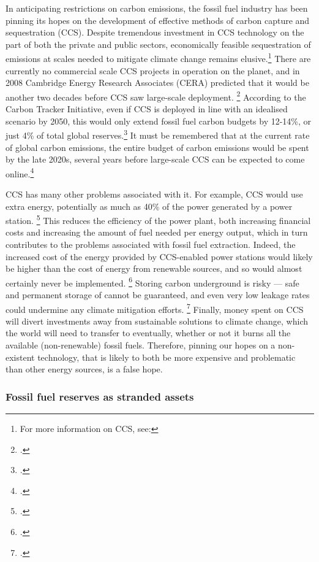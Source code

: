 In anticipating restrictions on carbon emissions, the fossil fuel industry has been pinning its hopes on the development of effective methods of carbon capture and sequestration (CCS). 
Despite tremendous investment in CCS technology on the part of both the private and public sectors, economically feasible sequestration of emissions at scales needed to mitigate climate change remains elusive.\footnote{For more information on CCS, see: }
There are currently no commercial scale CCS projects in operation on the planet, and in 2008 Cambridge Energy Research Associates (CERA) predicted that it would be another two decades before CCS saw large-scale deployment. \footcite{CERACrossing}
According to the Carbon Tracker Initiative, even if CCS is deployed in line with an idealised scenario by 2050, this would only extend fossil fuel carbon budgets by 12-14\%, or just 4\% of total global reserves.\footcite{CTI2013}
It must be remembered that at the current rate of global carbon emissions, the entire budget of carbon emissions would be spent by the late 2020s, several years before large-scale CCS can be expected to come online.\footcite{CTI2012}



CCS has many other problems associated with it. For example, CCS would use extra energy, potentially as much as 40\% of the power generated by a power station. \footcite{GPCCS}
This reduces the efficiency of the power plant, both increasing financial costs and increasing the amount of fuel needed per energy output, which in turn contributes to the problems associated with fossil fuel extraction.
Indeed, the increased cost of the energy provided by CCS-enabled power stations would likely be higher than the cost of energy from renewable sources, and so would almost certainly never be implemented. \footcite{SmartPlanetCCS}
Storing carbon underground is risky --- safe and permanent storage of  cannot be guaranteed, and even very low leakage rates could undermine any climate mitigation efforts. \footcite{GPCCS}
Finally, money spent on CCS will divert investments away from sustainable solutions to climate change, which the world will need to transfer to eventually, whether or not it burns all the available (non-renewable) fossil fuels.
Therefore, pinning our hopes on a non-existent technology, that is likely to both be more expensive and problematic than other energy sources, is a false hope.



	\subsubsection {Fossil fuel reserves as stranded assets} 



